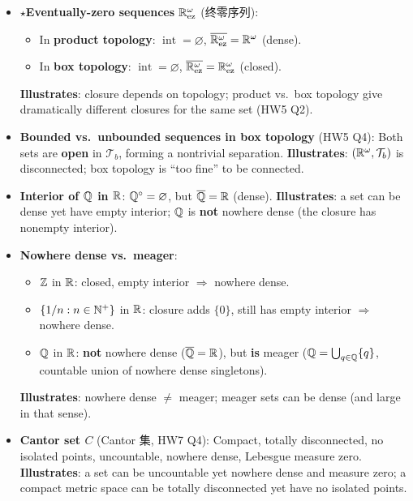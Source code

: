 \documentclass{article}
\newcommand{\starKey}{\textcolor{red!65!black}{\textbf{$\star$}}}
\begin{document}
\begin{itemize}
  \item \starKey \textbf{Eventually-zero sequences $\mathbb{R}^\omega_{\mathrm{ez}}$} (终零序列):
  \begin{itemize}
    \item In \textbf{product topology}: $\operatorname{int}=\varnothing$,
    $\overline{\mathbb{R}^\omega_{\mathrm{ez}}}=\mathbb{R}^\omega$ (dense).
    \item In \textbf{box topology}: $\operatorname{int}=\varnothing$,
    $\overline{\mathbb{R}^\omega_{\mathrm{ez}}}=\mathbb{R}^\omega_{\mathrm{ez}}$ (closed).
  \end{itemize}
  \textbf{Illustrates}: closure depends on topology; product vs.\ box topology
  give dramatically different closures for the same set (HW5 Q2).

  \item \textbf{Bounded vs.\ unbounded sequences in box topology} (HW5 Q4):
  Both sets are \textbf{open} in $\mathcal{T}_b$, forming a nontrivial separation.
  \textbf{Illustrates}: $(\mathbb{R}^\omega,\mathcal{T}_b)$ is disconnected;
  box topology is ``too fine'' to be connected.

  \item \textbf{Interior of $\mathbb{Q}$ in $\mathbb{R}$}: $\mathbb{Q}^\circ=\varnothing$,
  but $\overline{\mathbb{Q}}=\mathbb{R}$ (dense).
  \textbf{Illustrates}: a set can be dense yet have empty interior;
  $\mathbb{Q}$ is \textbf{not} nowhere dense (the closure has nonempty interior).

  \item \textbf{Nowhere dense vs.\ meager}:
  \begin{itemize}
    \item $\mathbb{Z}$ in $\mathbb{R}$: closed, empty interior $\Rightarrow$ nowhere dense.
    \item $\{1/n:n\in\mathbb{N}^+\}$ in $\mathbb{R}$: closure adds $\{0\}$, still has empty interior
    $\Rightarrow$ nowhere dense.
    \item $\mathbb{Q}$ in $\mathbb{R}$: \textbf{not} nowhere dense ($\overline{\mathbb{Q}}=\mathbb{R}$),
    but \textbf{is} meager ($\mathbb{Q}=\bigcup_{q\in\mathbb{Q}}\{q\}$, countable union of nowhere dense singletons).
  \end{itemize}
  \textbf{Illustrates}: nowhere dense $\neq$ meager;
  meager sets can be dense (and large in that sense).

  \item \textbf{Cantor set $C$} (Cantor 集, HW7 Q4):
  Compact, totally disconnected, no isolated points, uncountable, nowhere dense,
  Lebesgue measure zero.
  \textbf{Illustrates}: a set can be uncountable yet nowhere dense and measure zero;
  a compact metric space can be totally disconnected yet have no isolated points.
\end{itemize}
\end{document}
